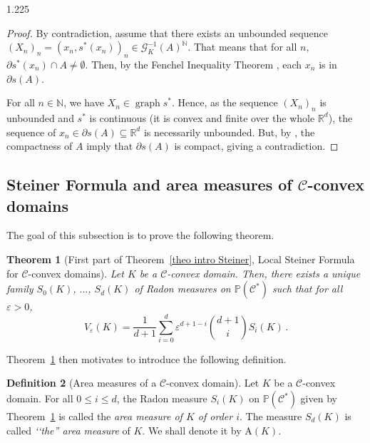 \documentclass[reqno, a4paper]{amsart}
\numberwithin{equation}{section}
\numberwithin{figure}{section}
\newtheorem{theorem}{Theorem}[section]
\theoremstyle{definition}
\newtheorem{definition}[theorem]{Definition}
\theoremstyle{remark}
\newcommand{\R}{\mathbb{R}} %
\newcommand{\N}{\mathbb{N}} %
\renewcommand{\P}{\mathbb{P}} %
\DeclareMathOperator{\graph}{graph} %
\newcommand{\C}{\mathcal{C}} %
\newcommand{\G}{\mathcal{G}} %
\newcommand{\Area}{\mathrm{A}} %
\begin{document}
\begin{spacing}{1.225}
\begin{proof}
By contradiction, assume that there exists an unbounded sequence $(X_n)_n = (x_n,s^*(x_n))_n \in \G_K^{-1}(A)^\N$. That means that for all $n$, $\partial s^*(x_n) \cap A \neq \emptyset$. Then, by the Fenchel Inequality Theorem \cite[Theorem~23.5]{Rockafellar_97}, each $x_n$ is in $\partial s(A)$. 

For all $n\in \N$, we have $X_n \in \graph s^*$. Hence, as the sequence $(X_n)_n$ is unbounded and $s^*$ is continuous (it is convex and finite over the whole $\R^d$), the sequence of $x_n \in \partial s(A) \subseteq \R^{d}$ is necessarily unbounded. But, by \cite[Lemma~A.22]{Figalli_17}, the compactness of $A$ imply that $\partial s(A)$ is compact, giving a contradiction. 
\end{proof}



\subsection{\texorpdfstring{Steiner Formula and area measures of $\C$-convex domains}{Steiner Formula and area measures of C-convex domains}}

The goal of this subsection is to prove the following theorem.

\begin{theorem}[{First part of Theorem~\ref{theo intro Steiner}}, Local Steiner Formula for $\C$-convex domains]
\label{theo Steiner}
Let $K$ be a $\C$-convex domain. Then, there exists a unique family $S_0(K)$, $\dots$, $S_d(K)$ of Radon measures on $\P(\C^*)$ such that for all $\varepsilon>0$,
\begin{equation*}
V_\varepsilon(K) = \frac{1}{d+1}\sum_{i=0}^{d}\varepsilon^{d+1-i} \binom{d+1}{i} S_i(K) \, . 
\end{equation*}
\end{theorem}

Theorem~\ref{theo Steiner} then motivates to introduce the following definition.

\begin{definition}[Area measures of a $\C$-convex domain]
Let $K$ be a $\C$-convex domain. For all $0 \leq i \leq d$, the Radon measure $S_i(K)$ on $\P(\C^*)$ given by Theorem~\ref{theo Steiner} is called the \emph{area measure of $K$ of order $i$}. The measure $S_d(K)$ is called \emph{‘‘the'' area measure} of $K$. We shall denote it by $\Area(K)$.
\end{definition}



\end{spacing}
\end{document}
